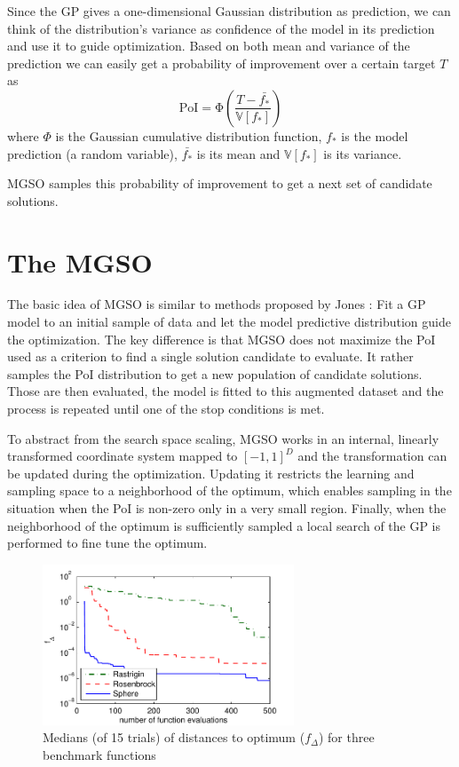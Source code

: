 \documentclass{sig-alternate}
\begin{document}
Since the GP gives a one-dimensional Gaussian distribution as prediction, we can think of the distribution's variance
as confidence of the model in its prediction and use it to guide optimization. Based on both mean 
and variance of the prediction we can easily get a probability of improvement \cite{jones01taxonomy} over a 
certain target $T$ as
$$
 \mathrm{PoI} = \mathrm{\Phi}\left( \frac{T - \bar{f_*}}{\mathbb{V}[f_*]} \right)
$$
where $\Phi$ is the Gaussian cumulative distribution function, $f_*$ is the model prediction (a random
variable), $\bar{f_*}$ is its mean and $\mathbb{V}[f_*]$ is its variance.

MGSO samples this probability of improvement to get a next set of candidate solutions.

\section{The MGSO}

The basic idea of MGSO is similar to methods proposed by Jones \cite{jones01taxonomy}: Fit a 
GP model to an initial sample of data and let the model predictive distribution guide the optimization. 
The key difference is that MGSO does not maximize the PoI used as a criterion to find a single
solution candidate to evaluate. It rather samples the PoI distribution to get a new population of
candidate solutions. Those are then evaluated, the model is fitted to this augmented 
dataset and the process is repeated until one of the stop conditions is met.

To abstract from the search space scaling, MGSO works in an internal, linearly transformed coordinate system 
mapped to $[-1, 1]^D$ and the transformation can be updated during the optimization. Updating it restricts the 
learning and sampling space to a neighborhood of the optimum, which enables sampling in the situation when 
the PoI is non-zero only in a very small region. Finally, when the neighborhood of the optimum is 
sufficiently sampled a local search of the GP is performed to fine tune the optimum. 

\begin{figure}
  \centering
  \includegraphics[width=7.5cm]{mgso_3func_2D}

  \caption{
    Medians (of 15 trials) of distances to optimum ($f_{\Delta}$) 
    for three benchmark functions}
  \label{fig:test}
\end{figure}
\end{document}
